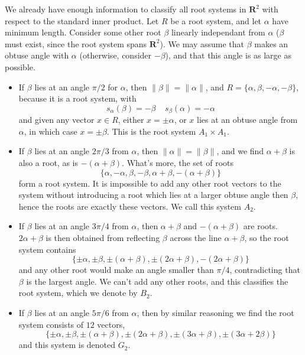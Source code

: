 \begin{example}
    We already have enough information to classify all root systems in $\mathbf{R}^2$ with respect to the standard inner product. Let $R$ be a root system, and let $\alpha$ have minimum length. Consider some other root $\beta$ linearly independant from $\alpha$ ($\beta$ must exist, since the root system spans $\mathbf{R}^2$). We may assume that $\beta$ makes an obtuse angle with $\alpha$ (otherwise, consider $-\beta$), and that this angle is as large as possible.
    \begin{itemize}
        \item If $\beta$ lies at an angle $\pi/2$ for $\alpha$, then $\| \beta \| = \| \alpha \|$, and $R = \{ \alpha, \beta, -\alpha, -\beta \}$, because it is a root system, with
        \[ s_\alpha(\beta) = -\beta\ \ \ \ \ s_\beta(\alpha) = -\alpha \]
        and given any vector $x \in R$, either $x = \pm \alpha$, or $x$ lies at an obtuse angle from $\alpha$, in which case $x = \pm \beta$. This is the root system $A_1 \times A_1$.

        \item If $\beta$ lies at an angle $2\pi/3$ from $\alpha$, then $\| \alpha \| = \| \beta \|$, and we find $\alpha + \beta$ is also a root, as is $-(\alpha + \beta)$. What's more, the set of roots
        \[ \{ \alpha, -\alpha, \beta, -\beta, \alpha + \beta, -(\alpha + \beta) \} \]
        form a root system. It is impossible to add any other root vectors to the system without introducing a root which lies at a larger obtuse angle then $\beta$, hence the roots are exactly these vectors. We call this system $A_2$.

        \item If $\beta$ lies at an angle $3\pi/4$ from $\alpha$, then $\alpha + \beta$ and $-(\alpha + \beta)$ are roots. $2\alpha + \beta$ is then obtained from reflecting $\beta$ across the line $\alpha + \beta$, so the root system contains
        \[ \{ \pm \alpha, \pm \beta, \pm(\alpha + \beta), \pm (2\alpha + \beta), -(2\alpha + \beta) \} \]
        and any other root would make an angle smaller than $\pi/4$, contradicting that $\beta$ is the largest angle. We can't add any other roots, and this classifies the root system, which we denote by $B_2$.

        \item If $\beta$ lies at an angle $5\pi/6$ from $\alpha$, then by similar reasoning we find the root system consists of $12$ vectors,
        \[ \{ \pm \alpha, \pm \beta, \pm(\alpha + \beta), \pm(2\alpha + \beta), \pm (3\alpha + \beta), \pm (3\alpha + 2\beta) \} \]
        and this system is denoted $G_2$.
    \end{itemize}
\end{example}

